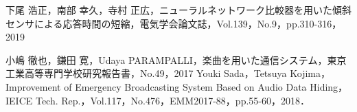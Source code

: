 \documentclass[a4j,11pt,dvipdfmx]{jsarticle}
\begin{document}
\begin{thebibliography}{99}


  下尾 浩正，南部 幸久，寺村 正広，ニューラルネットワーク比較器を用いた傾斜センサによる応答時間の短縮，電気学会論文誌，Vol.139，No.9，pp.310-316，2019

  小嶋 徹也，鎌田 寛，Udaya PARAMPALLI，楽曲を用いた通信システム，東京工業高等専門学校研究報告書，No.49，2017
  Youki Sada，Tetsuya Kojima，Improvement of Emergency Broadcasting System Based on Audio Data Hiding，IEICE Tech. Rep.，Vol.117，No.476，EMM2017-88，pp.55-60，2018．
\end{thebibliography}
\end{document}
